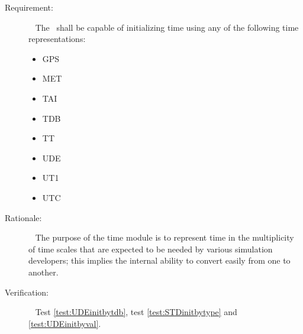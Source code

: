 \label{reqt:timeinitializationrep}
\begin{description}
  \item[Requirement:]\ \newline
    The \timeDesc\ shall be capable of initializing 
    time using any of the following time representations: 
		\begin{itemize}
		\item GPS
		\item MET
		\item TAI
		\item TDB
		\item TT
		\item UDE
		\item UT1
		\item UTC
		\end{itemize}

  \item[Rationale:]\ \newline
    The purpose of the time module is to represent 
    time in the multiplicity of time scales that are expected to be 
    needed by various simulation developers; this implies the internal ability
    to convert easily from one to another.

  \item[Verification:]\ \newline
    Test \vref{test:UDEinitbytdb}, test \vref{test:STDinitbytype} and \vref{test:UDEinitbyval}.
\end{description}


